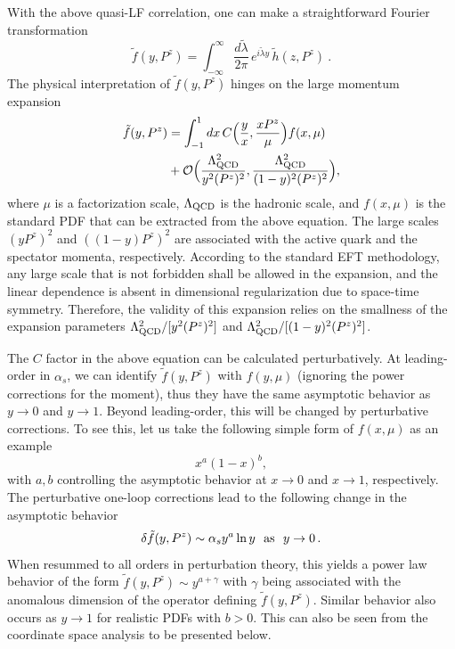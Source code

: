 With the above quasi-LF correlation, one can make a straightforward
Fourier transformation
\begin{equation}
    {\tilde f}(y,P^z) =\int^\infty_{-\infty} \frac{d\tilde \lambda}{2\pi}\, e^{i\tilde \lambda y}\, \tilde h(z, P^z)\ .
\end{equation}
The physical interpretation of ${\tilde f}(y,P^z)$ hinges on the large momentum
expansion~\cite{Ji:2013dva,Xiong:2013bka,Ma:2014jla,Izubuchi:2018srq}
\begin{align}\label{matching}
    {\tilde f}(y, P^z) &= \int^1_{-1} dx\, C\Big(\frac y x, \frac{xP^z}{\mu}\Big) f(x, \mu) \nonumber \\
    &+ {\cal O}\Big(\frac{\Lambda^2_{\rm QCD}}{y^2(P^z)^2}, \frac{\Lambda^2_{\rm QCD}}{(1-y)^2(P^z)^2}\Big),
\end{align}
where $\mu$ is a factorization scale, $\Lambda_{\rm QCD}$ is the hadronic scale, and
$f(x,\mu)$ is the standard PDF that can be extracted from the above equation.
The large scales $(yP^z)^2$ and $((1-y)P^z)^2$ are associated with the active quark
and the spectator momenta, respectively. According to the standard EFT methodology,
any large scale that is not forbidden shall be allowed in the expansion, and the linear
dependence is absent in dimensional regularization due to space-time symmetry.
Therefore, the validity of this expansion relies on the smallness of the expansion
parameters $\Lambda^2_{\rm QCD}/[y^2(P^z)^2]$ and $\Lambda^2_{\rm QCD}/[(1-y)^2(P^z)^2]$.

The $C$ factor in the above equation can be calculated perturbatively. At leading-order in $\alpha_s$, we can identify $\tilde f(y, P^z)$ with $f(y,\mu)$ (ignoring the power corrections for the moment), thus they have the same asymptotic behavior as $y\to 0$ and $y\to1$. Beyond leading-order, this will be changed by perturbative corrections. To see this, let us take the following simple form of $f(x, \mu)$ as an example
\begin{equation}
x^a (1-x)^b,
\end{equation}
with $a, b$ controlling the asymptotic behavior at $x\to 0$ and $x\to 1$, respectively. The perturbative one-loop corrections lead to the following change in the asymptotic behavior
\begin{align}
\delta\tilde f(y, P^z)\sim \alpha_s y^a \ln y \ \  {\rm as}\ \  y\to 0\,.
\end{align}
When resummed to all orders in perturbation theory, this yields a power law behavior of the form $\tilde f(y, P^z)\sim  y^{a+\gamma}$ with $\gamma$ being associated with the anomalous dimension of the operator defining $\tilde f(y, P^z)$. Similar behavior also occurs as $y\to 1$ for realistic PDFs with $b>0$. This can also be seen from the coordinate space analysis to be presented below.

